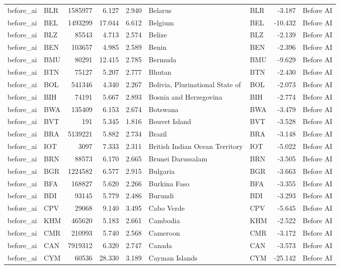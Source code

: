 \begin{tabular}{llrrrllrl}
before\_ai & BLR & 1585977 & 6.127 & 2.940 & Belarus & BLR & -3.187 & Before AI \\
before\_ai & BEL & 1493299 & 17.044 & 6.612 & Belgium & BEL & -10.432 & Before AI \\
before\_ai & BLZ & 85543 & 4.713 & 2.574 & Belize & BLZ & -2.139 & Before AI \\
before\_ai & BEN & 103657 & 4.985 & 2.589 & Benin & BEN & -2.396 & Before AI \\
before\_ai & BMU & 80291 & 12.415 & 2.785 & Bermuda & BMU & -9.629 & Before AI \\
before\_ai & BTN & 75127 & 5.207 & 2.777 & Bhutan & BTN & -2.430 & Before AI \\
before\_ai & BOL & 541346 & 4.340 & 2.267 & Bolivia, Plurinational State of & BOL & -2.073 & Before AI \\
before\_ai & BIH & 74191 & 5.667 & 2.893 & Bosnia and Herzegovina & BIH & -2.774 & Before AI \\
before\_ai & BWA & 135409 & 6.153 & 2.674 & Botswana & BWA & -3.479 & Before AI \\
before\_ai & BVT & 191 & 5.345 & 1.816 & Bouvet Island & BVT & -3.528 & Before AI \\
before\_ai & BRA & 5139221 & 5.882 & 2.734 & Brazil & BRA & -3.148 & Before AI \\
before\_ai & IOT & 3097 & 7.333 & 2.311 & British Indian Ocean Territory & IOT & -5.022 & Before AI \\
before\_ai & BRN & 88573 & 6.170 & 2.665 & Brunei Darussalam & BRN & -3.505 & Before AI \\
before\_ai & BGR & 1224582 & 6.577 & 2.915 & Bulgaria & BGR & -3.663 & Before AI \\
before\_ai & BFA & 168827 & 5.620 & 2.266 & Burkina Faso & BFA & -3.355 & Before AI \\
before\_ai & BDI & 93145 & 5.779 & 2.486 & Burundi & BDI & -3.293 & Before AI \\
before\_ai & CPV & 29068 & 9.140 & 3.495 & Cabo Verde & CPV & -5.645 & Before AI \\
before\_ai & KHM & 465620 & 5.183 & 2.661 & Cambodia & KHM & -2.522 & Before AI \\
before\_ai & CMR & 210993 & 5.740 & 2.568 & Cameroon & CMR & -3.172 & Before AI \\
before\_ai & CAN & 7919312 & 6.320 & 2.747 & Canada & CAN & -3.573 & Before AI \\
before\_ai & CYM & 60536 & 28.330 & 3.189 & Cayman Islands & CYM & -25.142 & Before AI \\

\end{tabular}
